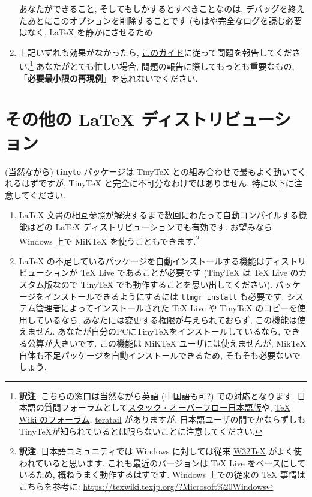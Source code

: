 \documentclass[
  xelatex,ja=standard,jafont=noto]{bxjsreport}
\begin{document}
\begin{enumerate}
  あなたができること, そしてもしかするとすべきことなのは,
  デバッグを終えたあとにこのオプションを削除することです
  (もはや完全なログを読む必要はなく, LaTeX を静かにさせるため
\item
  上記いずれも効果がなかったら,
  \href{https://yihui.org/issue/}{このガイド}に従って問題を報告してください.\footnote{\textbf{訳注}:
    こちらの窓口は当然ながら英語 (中国語も可?) での対応となります.
    日本語の質問フォーラムとして\href{https://ja.stackoverflow.com/questions/tagged/latex}{スタック・オーバーフロー日本語版}や,
    \href{https://oku.edu.mie-u.ac.jp/tex/}{TeX Wiki のフォーラム},
    \href{https://teratail.com/tags/LaTeX}{teratail} がありますが,
    日本語ユーザの間でかならずしもTinyTeXが知られているとは限らないことに注意してください.}
  あなたがとても忙しい場合, 問題の報告に際してもっとも重要なもの,
  「\textbf{必要最小限の再現例}」を忘れないでください.
\end{enumerate}

\hypertarget{ux305dux306eux4ed6ux306e-latex-ux30c7ux30a3ux30b9ux30c8ux30eaux30d3ux30e5ux30fcux30b7ux30e7ux30f3}{%
\section{その他の LaTeX
ディストリビューション}\label{ux305dux306eux4ed6ux306e-latex-ux30c7ux30a3ux30b9ux30c8ux30eaux30d3ux30e5ux30fcux30b7ux30e7ux30f3}}

(当然ながら) \textbf{tinyte} パッケージは TinyTeX
との組み合わせで最もよく動いてくれるはずですが, TinyTeX
と完全に不可分なわけではありません. 特に以下に注意してください.

\begin{enumerate}
\def\labelenumi{\arabic{enumi}.}
\item
  LaTeX
  文書の相互参照が解決するまで数回にわたって自動コンパイルする機能はどの
  LaTeX ディストリビューションでも有効です. お望みなら Windows 上で
  MiKTeX を使うこともできます.\footnote{\textbf{訳注}:
    日本語コミュニティでは Windows に対しては従来
    \href{http://w32tex.org/}{W32TeX} がよく使われていると思います.
    これも最近のバージョンは TeX Live をベースにしているため,
    概ねうまく動作するはずです. Windows 上での従来の TeX
    事情はこちらを参考に:
    \url{https://texwiki.texjp.org/?Microsoft\%20Windows}}
\item
  LaTeX
  の不足しているパッケージを自動インストールする機能はディストリビューションが
  TeX Live であることが必要です (TinyTeX は TeX Live のカスタム版なので
  TinyTeX でも動作することを思い出してください).
  パッケージをインストールできるようにするには \texttt{tlmgr\ install}
  も必要です. システム管理者によってインストールされた TeX Live や
  TinyTeX のコピーを使用しているなら,
  あなたには変更する権限が与えられておらず, この機能は使えません.
  あなたが自分のPCにTinyTeXをインストールしているなら,
  できる公算が大きいです. この機能は MiKTeX ユーザには使えませんが,
  MikTeX 自体も不足パッケージを自動インストールできるため,
  そもそも必要ないでしょう.
\end{enumerate}
\end{document}
